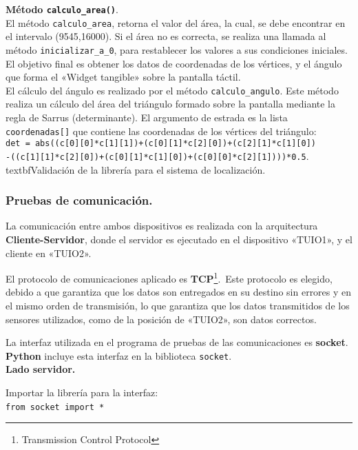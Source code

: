 \textbf{Método \texttt{calculo\_area()}}.\\
El método \texttt{calculo\_area}, retorna el valor del área, la cual, se debe encontrar en el intervalo (9545,16000). 
Si el área no es correcta, se realiza una llamada al método \texttt{inicializar\_a\_0}, para restablecer los valores a sus condiciones iniciales. 
El objetivo final es obtener los datos de coordenadas de los vértices, y el ángulo que forma el «Widget tangible» sobre la pantalla táctil.\\ 

El cálculo del ángulo es realizado por el método \texttt{calculo\_angulo}.
Este método realiza un cálculo del área del triángulo formado sobre la pantalla mediante la regla de Sarrus (determinante).
El argumento de estrada es la lista \texttt{coordenadas[]} que contiene las coordenadas de los vértices del triángulo:\\
\texttt{det = abs((c[0][0]*c[1][1])+(c[0][1]*c[2][0])+(c[2][1]*c[1][0])}\\
\texttt{-((c[1][1]*c[2][0])+(c[0][1]*c[1][0])+(c[0][0]*c[2][1])))*0.5}.\\

textbf{Validación de la librería para el sistema de localización.}\


\subsubsection{Pruebas de comunicación.}

La comunicación entre ambos dispositivos es realizada con la arquitectura \textbf{Cliente-Servidor}, donde el servidor es ejecutado en el dispositivo «TUIO1», y el cliente en «TUIO2».\

El protocolo de comunicaciones aplicado es \textbf{TCP}\footnote{Transmission Control Protocol}.\
Este protocolo es elegido, debido a que garantiza que los datos son entregados en su destino sin errores y en el mismo orden de transmisión, lo que garantiza que los datos transmitidos de los sensores utilizados, como de la posición de «TUIO2», son datos correctos.\

La interfaz utilizada en el programa de pruebas de las comunicaciones es \textbf{socket}. \textbf{Python} incluye esta interfaz en la biblioteca \texttt{socket}.\\

\textbf{Lado servidor.}\

Importar la librería para la interfaz:\\
\texttt{from socket import *}\

